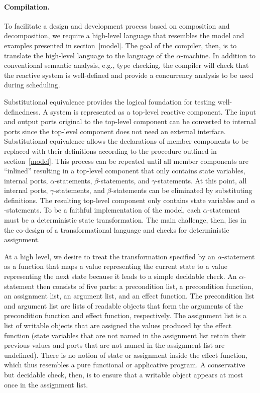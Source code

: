 \paragraph{Compilation.}
To facilitate a design and development process based on composition and decomposition, we require a high-level language that resembles the model and examples presented in section~\ref{model}.
The goal of the compiler, then, is to translate the high-level language to the language of the $\alpha$-machine.
In addition to conventional semantic analysis, e.g., type checking, the compiler will check that the reactive system is well-defined and provide a concurrency analysis to be used during scheduling.

Substitutional equivalence provides the logical foundation for testing well-definedness.
A system is represented as a top-level reactive component.
The input and output ports original to the top-level component can be converted to internal ports since the top-level component does not need an external interface.
Substitutional equivalence allows the declarations of member components to be replaced with their definitions according to the procedure outlined in section~\ref{model}.
This process can be repeated until all member components are ``inlined'' resulting in a top-level component that only contains state variables, internal ports, $\alpha$-statements, $\beta$-statements, and $\gamma$-statements.
At this point, all internal ports, $\gamma$-statements, and $\beta$-statements can be eliminated by substituting definitions.
The resulting top-level component only contains state variables and $\alpha$-statements.
To be a faithful implementation of the model, each $\alpha$-statement must be a deterministic state transformation.
The main challenge, then, lies in the co-design of a transformational language and checks for deterministic assignment.

At a high level, we desire to treat the transformation specified by an $\alpha$-statement as a function that maps a value representing the current state to a value representing the next state because it leads to a simple decidable check.
An $\alpha$-statement then consists of five parts:  a precondition list, a precondition function, an assignment list, an argument list, and an effect function.
The precondition list and argument list are lists of readable objects that form the arguments of the precondition function and effect function, respectively.
The assignment list is a list of writable objects that are assigned the values produced by the effect function (state variables that are not named in the assignment list retain their previous values and ports that are not named in the assignment list are undefined).
There is no notion of state or assignment inside the effect function, which thus resembles a pure functional or applicative program.
A conservative but decidable check, then, is to ensure that a writable object appears at most once in the assignment list.

